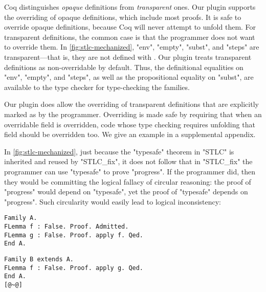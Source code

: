 Coq distinguishes \emph{opaque} definitions from \emph{transparent} ones.
Our plugin supports the overriding of opaque definitions, which
include most proofs.
It is safe to override opaque definitions, because Coq will never attempt to unfold them.
For transparent definitions, the common case is that the programmer does
not want to override them.
In \cref{fig:stlc-mechanized}, "env", "empty", "subst", and "steps" are
transparent---that is, they are not defined with .
Our plugin treats transparent definitions as non-overridable by default.
Thus, the definitional equalities on "env", "empty", and "steps",
as well as the propositional equality on "subst", are available to the
type checker for type-checking the families.

Our plugin does allow the overriding of transparent definitions that are
explicitly marked as  by the programmer.
Overriding is made safe by requiring that when an overridable field is
overridden, code whose type checking requires unfolding that field
should be overridden too.
We give an example in a supplemental appendix.



In \cref{fig:stlc-mechanized}, just because the "typesafe" theorem in
"STLC" is inherited and reused by "STLC_fix", it does not follow that
in "STLC_fix" the programmer can use "typesafe" to prove "progress".
If the programmer did, then they would be committing the logical fallacy
of circular reasoning: the proof of "progress" would depend on "typesafe",
yet the proof of "typesafe" depends on "progress".
%
Such circularity would easily lead to logical inconsistency:

\begin{centered}
\begin{minipage}{36ex}
\begin{lstlisting}[basicstyle=\fontsize{8.25}{9}\ttfamily]
Family A.
FLemma f : False. Proof. Admitted.
FLemma g : False. Proof. apply f. Qed.
End A.
\end{lstlisting}
\end{minipage}
\hspace{3.5em}
\begin{minipage}{36ex}
\begin{lstlisting}[basicstyle=\fontsize{8.25}{9}\ttfamily]
Family B extends A.
FLemma f : False. Proof. apply g. Qed.
End A.
[@~@]
\end{lstlisting}
\end{minipage}
\end{centered}

